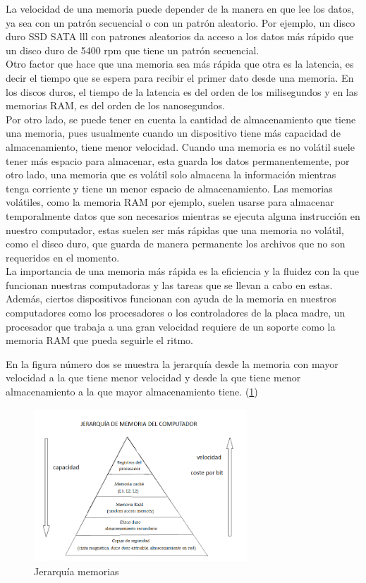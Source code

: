 \documentclass{article}
\begin{document}
La velocidad de una memoria puede depender de la manera en que lee los datos, ya sea con un patrón secuencial o con un patrón aleatorio. Por ejemplo, un disco duro SSD SATA lll con patrones aleatorios da acceso a los datos más rápido que un disco duro de 5400 rpm que tiene un patrón secuencial\cite{Alelua}.\\
Otro factor que hace que una memoria sea más rápida que otra es la latencia, es decir el tiempo que se espera para recibir el primer dato desde una memoria. En los discos duros, el tiempo de la latencia es del orden de los milisegundos y en las memorias RAM, es del orden de los nanosegundos\cite{Alelua}.\\
Por otro lado, se puede tener en cuenta la cantidad de almacenamiento que tiene una memoria, pues usualmente cuando un dispositivo tiene más capacidad de almacenamiento, tiene menor velocidad. Cuando una memoria es no volátil suele tener más espacio para almacenar, esta guarda los datos permanentemente, por otro lado, una memoria que es volátil solo almacena la información mientras tenga corriente y tiene un menor espacio de almacenamiento. Las memorias volátiles, como la memoria RAM por ejemplo, suelen usarse para almacenar temporalmente datos que son necesarios mientras se ejecuta alguna instrucción en nuestro computador, estas suelen ser más rápidas que una memoria no volátil, como el disco duro, que guarda de manera permanente los archivos que no son requeridos en el momento.\\
La importancia de una memoria más rápida es la eficiencia y la fluidez con la que funcionan nuestras computadoras y las tareas que se llevan a cabo en estas. Además, ciertos dispositivos funcionan con ayuda de la memoria en nuestros computadores como los procesadores o  los controladores de la placa madre, un procesador que trabaja a una gran velocidad requiere de un soporte como la memoria RAM que pueda seguirle el ritmo\cite{Alelua}.


En la figura número dos se muestra la jerarquía desde la memoria con mayor velocidad a la que tiene menor velocidad y desde la que tiene menor almacenamiento a la que mayor almacenamiento tiene. (\ref{fig:jerarquia})

\begin{figure}[h]
\includegraphics[width=8cm]{jerarquia.png}
\centering
\caption{Jerarquía memorias}
\label{fig:jerarquia}
\end{figure}
\end{document}
